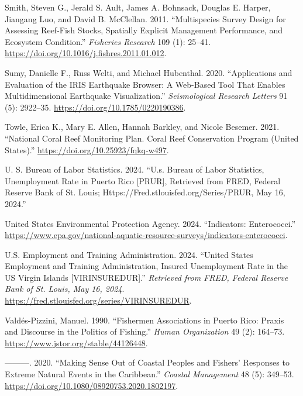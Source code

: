 \documentclass[
  letterpaper,
  oneside,
  open=any]{scrbook}
\newlength{\cslhangindent}
\newenvironment{CSLReferences}[2] %
 {\begin{list}{}{%
  \setlength{\itemindent}{0pt}
  \setlength{\leftmargin}{0pt}
  \setlength{\parsep}{0pt}
  \ifodd #1
   \setlength{\leftmargin}{\cslhangindent}
   \setlength{\itemindent}{-1\cslhangindent}
  \fi
  \setlength{\itemsep}{#2\baselineskip}}}
 {\end{list}}
\begin{document}
\begin{CSLReferences}{1}{0}
Smith, Steven G., Jerald S. Ault, James A. Bohnsack, Douglas E. Harper,
Jiangang Luo, and David B. McClellan. 2011. {``Multispecies Survey
Design for Assessing Reef-Fish Stocks, Spatially Explicit Management
Performance, and Ecosystem Condition.''} \emph{Fisheries Research} 109
(1): 25--41. \url{https://doi.org/10.1016/j.fishres.2011.01.012}.

Sumy, Danielle F., Russ Welti, and Michael Hubenthal. 2020.
{``Applications and Evaluation of the IRIS Earthquake Browser: A
Web{-}Based Tool That Enables Multidimensional Earthquake
Visualization.''} \emph{Seismological Research Letters} 91 (5):
2922--35. \url{https://doi.org/10.1785/0220190386}.

Towle, Erica K., Mary E. Allen, Hannah Barkley, and Nicole Besemer.
2021. {``National Coral Reef Monitoring Plan. Coral Reef Conservation
Program (United States).''} \url{https://doi.org/10.25923/fqkq-w497}.

U. S. Bureau of Labor Statistics. 2024. {``U.s. Bureau of Labor
Statistics, Unemployment Rate in Puerto Rico {[}PRUR{]}, Retrieved from
FRED, Federal Reserve Bank of St. Louis;
Https://Fred.stlouisfed.org/Series/PRUR, May 16, 2024.''}

United States Environmental Protection Agency. 2024. {``Indicators:
Enterococci.''}
\url{https://www.epa.gov/national-aquatic-resource-surveys/indicators-enterococci}.

U.S. Employment and Training Administration. 2024. {``United States
Employment and Training Administration, Insured Unemployment Rate in the
US Virgin Islands {[}VIRINSUREDUR{]}.''} \emph{Retrieved from FRED,
Federal Reserve Bank of St. Louis, May 16, 2024}.
\url{https://fred.stlouisfed.org/series/VIRINSUREDUR}.

Valdés-Pizzini, Manuel. 1990. {``Fishermen Associations in Puerto Rico:
Praxis and Discourse in the Politics of Fishing.''} \emph{Human
Organization} 49 (2): 164--73.
\url{https://www.jstor.org/stable/44126448}.

---------. 2020. {``Making Sense Out of Coastal Peoples and Fishers'
Responses to Extreme Natural Events in the Caribbean.''} \emph{Coastal
Management} 48 (5): 349--53.
\url{https://doi.org/10.1080/08920753.2020.1802197}.


\end{CSLReferences}
\end{document}
